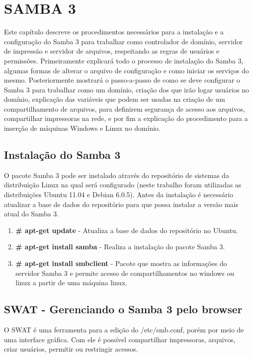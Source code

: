 \chapter{SAMBA 3}
Este capítulo descreve os procedimentos necessários para a instalação e a configuração do Samba 3 para trabalhar como controlador de domínio, servidor de impressão e servidor de arquivos, respeitando as regras de usuários e permissões.
Primeiramente explicará todo o processo de instalação do Samba 3, algumas formas de alterar o arquivo de configuração e como iniciar os serviços do mesmo. Posteriormente mostrará o passo-a-passo de como se deve configurar o Samba 3 para trabalhar como um domínio, criação dos que irão logar usuários no domínio, explicação das variáveis que podem ser usadas na criação de um compartilhamento de arquivos, para definirem segurança de acesso aos arquivos, compartilhar impressoras na rede, e por fim a explicação do procedimento para a inserção de máquinas Windows e Linux no domínio.

\section{Instalação do Samba 3}

O pacote Samba 3 pode ser instalado através do repositório de sistemas da distribuição Linux na qual será configurado (neste trabalho foram utilizadas as distribuições Ubuntu 11.04 e Debian 6.0.5). Antes da instalação é necessário atualizar a base de dados do repositório para que possa instalar a versão mais atual do Samba 3.
 
\begin{enumerate}
    \item \textbf{\# apt-get update} - Atualiza a base de dados do repositório no Ubuntu.
    \item \textbf{\# apt-get install samba} - Realiza a instalação do pacote Samba 3.
    \item \textbf{\# apt-get install smbclient} - Pacote que mostra as informações do servidor Samba 3 e permite acesso de compartilhamentos no windows ou linux a partir de uma máquina linux.
\end{enumerate}

\section{SWAT - Gerenciando o Samba 3 pelo browser}

O SWAT é uma ferramenta para a edição do /etc/smb.conf, porém por meio de uma interface gráfica. Com ele é possível compartilhar impressoras, arquivos, criar usuários, permitir ou restringir acessos.

